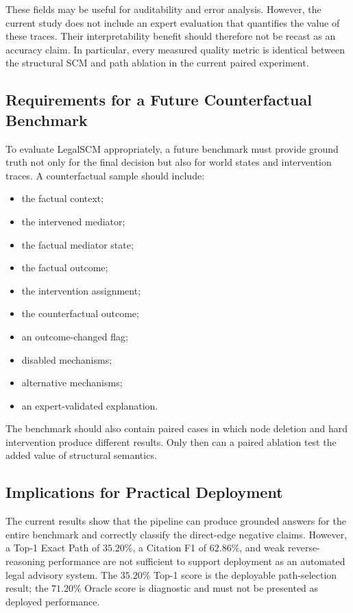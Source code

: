 These fields may be useful for auditability and error analysis. However, the
current study does not include an expert evaluation that quantifies the
value of these traces. Their interpretability benefit should therefore not
be recast as an accuracy claim. In particular, every measured quality metric
is identical between the structural SCM and path ablation in the current
paired experiment.

\subsection{Requirements for a Future Counterfactual Benchmark}

To evaluate LegalSCM appropriately, a future benchmark must provide ground
truth not only for the final decision but also for world states and
intervention traces. A counterfactual sample should include:

\begin{itemize}
    \item the factual context;
    \item the intervened mediator;
    \item the factual mediator state;
    \item the factual outcome;
    \item the intervention assignment;
    \item the counterfactual outcome;
    \item an outcome-changed flag;
    \item disabled mechanisms;
    \item alternative mechanisms;
    \item an expert-validated explanation.
\end{itemize}

The benchmark should also contain paired cases in which node deletion and
hard intervention produce different results. Only then can a paired
ablation test the added value of structural semantics.

\subsection{Implications for Practical Deployment}

The current results show that the pipeline can produce grounded answers for
the entire benchmark and correctly classify the direct-edge negative claims.
However, a Top-1 Exact Path of \(35.20\%\), a Citation F1 of \(62.86\%\),
and weak reverse-reasoning performance are not sufficient to support
deployment as an automated legal advisory system. The \(35.20\%\) Top-1
score is the deployable path-selection result; the \(71.20\%\) Oracle score
is diagnostic and must not be presented as deployed performance.

